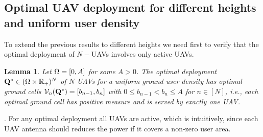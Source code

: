 \documentclass[smallabstract,smallcaptions]{dccpaper}
\newtheorem{lemma}{Lemma}
\newenvironment{remark}{\par\vspace{1.5ex}\noindent{\em Remark\/}.}{\par\vspace{1.5ex}}
\newcommand{\Vor}{\ensuremath{\mathcal{V}}}         %
\newcommand{\philippstart}{\color{black}}
\begin{document}
\subsection{Optimal UAV deployment for different heights and uniform user density}

To extend the previous results to different heights we need first to verify that the optimal deployment of $N-$UAVs
involves only active UAVs. 
%
\philippstart
%
\begin{lemma}\label{lemma:allActive}
  Let $\Omega=[0,A]$ for some $A>0$. The optimal deployment $\mathbf Q^*\in(\Omega\times{\ensuremath{\mathbb R}}_+)^N$ of $N$ UAVs for a uniform
  ground user density has optimal ground cells $\Vor_n(\vQ^*)=[b_{n-1},b_n]$ with $0\leq b_{n-1}<b_n\leq
  A$ for $n\in[N]$,
  i.e., each optimal ground cell has positive measure and is served by exactly one UAV. 
\end{lemma}
%
\begin{remark}
  For any optimal deployment all UAVs are active, which is intuitively, since each UAV
  antenna should reduces the power if it covers a non-zero user area.
\end{remark}
%
\end{document}
